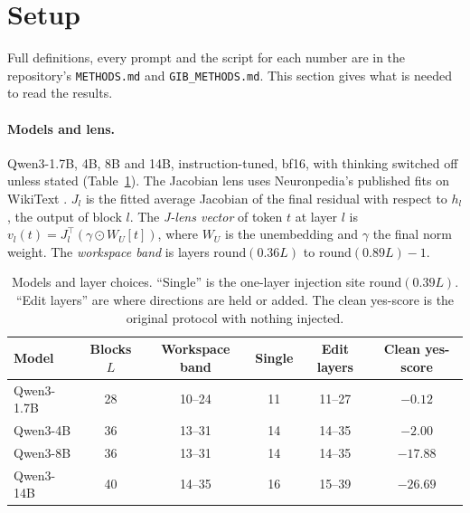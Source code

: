 \documentclass[11pt]{article}
\newcommand{\ys}{yes-score}
\begin{document}
\section{Setup}\label{sec:setup}

Full definitions, every prompt and the script for each number are in the repository's \texttt{METHODS.md} and \texttt{GIB\_METHODS.md}. This section gives what is needed to read the results.

\paragraph{Models and lens.} Qwen3-1.7B, 4B, 8B and 14B, instruction-tuned, bf16, with thinking switched off unless stated (Table~\ref{tab:setup}). The Jacobian lens \citep{gurnee2026workspace,jlenscode} uses Neuronpedia's published fits on WikiText \citep{neuronpedia2026jlens}. $J_l$ is the fitted average Jacobian of the final residual with respect to $h_l$, the output of block $l$. The \emph{J-lens vector} of token $t$ at layer $l$ is $v_l(t)=J_l^{\top}(\gamma\odot W_U[t])$, where $W_U$ is the unembedding and $\gamma$ the final norm weight. The \emph{workspace band} is layers $\mathrm{round}(0.36L)$ to $\mathrm{round}(0.89L)-1$.

\begin{table}[t]
\caption{Models and layer choices. ``Single'' is the one-layer injection site $\mathrm{round}(0.39L)$. ``Edit layers'' are where directions are held or added. The clean \ys{} is the original protocol with nothing injected.}
\label{tab:setup}
\centering
\small
\begin{tabular}{@{}lccccc@{}}
\toprule
Model & Blocks $L$ & Workspace band & Single & Edit layers & Clean \ys{} \\
\midrule
Qwen3-1.7B & 28 & 10--24 & 11 & 11--27 & $-0.12$ \\
Qwen3-4B & 36 & 13--31 & 14 & 14--35 & $-2.00$ \\
Qwen3-8B & 36 & 13--31 & 14 & 14--35 & $-17.88$ \\
Qwen3-14B & 40 & 14--35 & 16 & 15--39 & $-26.69$ \\
\bottomrule
\end{tabular}
\end{table}
\end{document}
